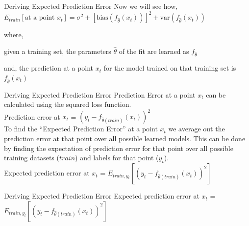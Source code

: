 \documentclass{beamer}
\begin{document}
\begin{frame}{Deriving Expected Prediction Error}
Now we will see how, 
$ E_{train}[\text{at a point } x_t] = \sigma^2 + [\text{bias}(f_{\hat{\theta}}(x_t))]^2 + \text{var}(f_{\hat{\theta}}(x_t)) $

where, 

given a training set, the parameters $\hat{\theta}$ of the fit are learned as $f_{\hat{\theta}}$ 

and, the prediction at a point $x_t$ for the model trained on that training set is $f_{\hat{\theta}}(x_t)$
\end{frame}

\begin{frame}{Deriving Expected Prediction Error}
Prediction Error at a point $x_t$ can be calculated using the squared loss function.\\
\vspace{0.5cm}
 Prediction error at $x_t$ = $(y_t - f_{\hat\theta(train)}(x_t))^2$\\
\vspace{0.5cm}
To find the ``Expected Prediction Error'' at a point $x_t$ we average out the prediction error at that point over all possible learned models. This can be done by finding the expectation of prediction error for that point over all possible training datasets ($train$) and labels for that point ($y_t$).  \\
\vspace{0.5cm}
Expected prediction error at $x_t$ = $E_{train,y_t}[(y_t - f_{\hat\theta(train)}(x_t))^2]$\\
\end{frame}

\begin{frame}{Deriving Expected Prediction Error}
Expected prediction error at $x_t$ = $E_{train,y_t}[(y_t - f_{\hat\theta(train)}(x_t))^2]$\\
\vspace{0.5cm}

\end{frame}
\end{document}

